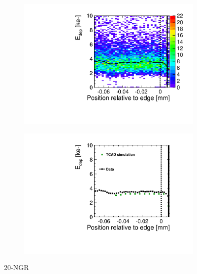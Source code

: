 \newpage
\begin{figure}[htbp]
  \centering
  \begin{subfigure}[b]{0.5\linewidth}
    \includegraphics[width=\textwidth]{figures/ActiveEdge/TCAD_data_Edep_20_NGR.pdf}
    \caption{}
  \end{subfigure}\hfill
  \begin{subfigure}[b]{0.5\linewidth}
    \includegraphics[width=\textwidth]{figures/ActiveEdge/TCAD_data_20_NGR.pdf}
    \caption{}
  \end{subfigure}
  \caption{20-NGR}
  \label{fig:TCAD_vs_data_20_NGR}
\end{figure}

